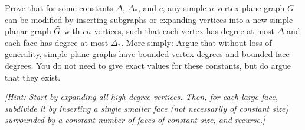 \documentclass[11pt]{article}
\begin{document}
Prove that for some constants \(\Delta\), \(\Delta_*\), and \(c\), any simple \(n\)-vertex plane graph \(G\) can be modified by inserting subgraphs or expanding vertices into a new simple planar graph \(\Tilde{G}\) with \(cn\) vertices, such that each vertex has degree at most \(\Delta\) and each face has degree at most \(\Delta_*\). More simply: Argue that without loss of generality, simple plane graphs have bounded vertex degrees and bounded face degrees. You do not need to give exact values for these constants, but do argue that they exist.

\textit{[Hint: Start by expanding all high degree vertices. Then, for each large face, subdivide it
by inserting a single smaller face (not necessarily of constant size) surrounded by a constant
number of faces of constant size, and recurse.]}
\end{document}
